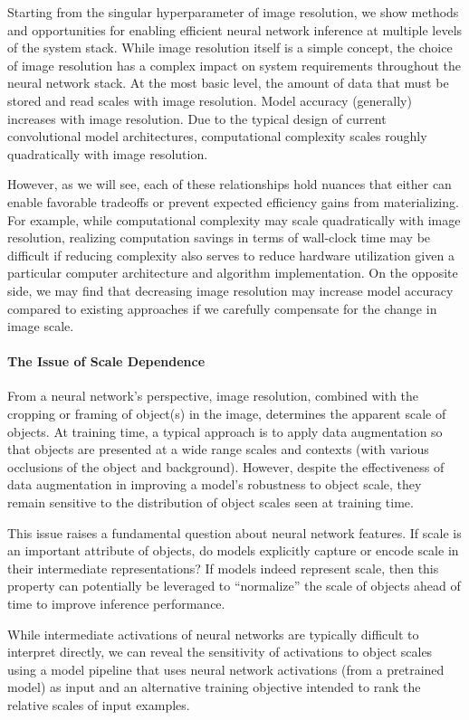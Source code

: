 Starting from the singular hyperparameter of image resolution, we show methods and opportunities for enabling efficient neural network inference at multiple levels of the system stack.
While image resolution itself is a simple concept, the choice of image resolution has a complex impact on system requirements throughout the neural network stack.
At the most basic level, the amount of data that must be stored and read scales with image resolution.
Model accuracy (generally) increases with image resolution.
Due to the typical design of current convolutional model architectures, computational complexity scales roughly quadratically with image resolution.

However, as we will see, each of these relationships hold nuances that either can enable favorable tradeoffs or prevent expected efficiency gains from materializing.
For example, while computational complexity may scale quadratically with image resolution, realizing computation savings in terms of wall-clock time may be difficult if reducing complexity also serves to reduce hardware utilization given a particular computer architecture and algorithm implementation.
On the opposite side, we may find that decreasing image resolution may increase model accuracy compared to existing approaches if we carefully compensate for the change in image scale.


\paragraph{The Issue of Scale Dependence}
From a neural network's perspective, image resolution, combined with the cropping or framing of object(s) in the image, determines the apparent scale of objects.
At training time, a typical approach is to apply data augmentation so that objects are presented at a wide range scales and contexts (with various occlusions of the object and background).
However, despite the effectiveness of data augmentation in improving a model's robustness to object scale, they remain sensitive to the distribution of object scales seen at training time.

This issue raises a fundamental question about neural network features.
If scale is an important attribute of objects, do models explicitly capture or encode scale in their intermediate representations?
If models indeed represent scale, then this property can potentially be leveraged to ``normalize'' the scale of objects ahead of time to improve inference performance.

While intermediate activations of neural networks are typically difficult to interpret directly, we can reveal the sensitivity of activations to object scales using a model pipeline that uses neural network activations (from a pretrained model) as input and an alternative training objective intended to rank the relative scales of input examples.

